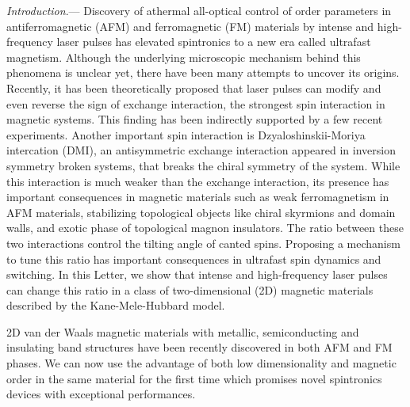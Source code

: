 \documentclass[aps,prl,twocolumn,amsmath,amssymb,nobibnotes]{revtex4-1}%
\begin{document}
\textit{Introduction}.--- Discovery of athermal all-optical control of order parameters in antiferromagnetic (AFM) and ferromagnetic (FM) materials by intense and high-frequency laser pulses has elevated spintronics to a new era called ultrafast magnetism. Although the underlying microscopic mechanism behind this phenomena is unclear yet, there have been many attempts to uncover its origins. Recently, it has been theoretically proposed that laser pulses can modify and even reverse the sign of exchange interaction, the strongest spin interaction in magnetic systems. This finding has been indirectly supported by a few recent experiments. Another important spin interaction is Dzyaloshinskii-Moriya intercation (DMI), an antisymmetric exchange interaction appeared in inversion symmetry broken systems, that breaks the chiral symmetry of the system. While this interaction is much weaker than the exchange interaction, its presence has important consequences in magnetic materials such as weak ferromagnetism in AFM materials, stabilizing topological objects like chiral skyrmions and domain walls, and exotic phase of topological magnon insulators. The ratio between these two interactions control the tilting angle of canted spins. Proposing a mechanism to tune this ratio has important consequences in ultrafast spin dynamics and switching. In this Letter, we show that intense and high-frequency laser pulses can change this ratio in a class of two-dimensional (2D) magnetic materials described by the Kane-Mele-Hubbard model.

2D van der Waals magnetic materials with metallic, semiconducting and insulating band structures have been recently discovered in both AFM and FM phases. We can now use the advantage of both low dimensionality and magnetic order in the same material for the first time which promises novel spintronics devices with exceptional performances.
\end{document}
